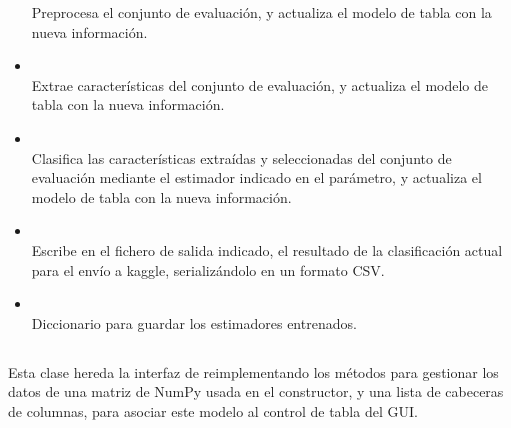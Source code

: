 \begin{itemize}
Preprocesa el conjunto de evaluación, y actualiza el modelo de tabla con la nueva información.
\item {}\\
Extrae características del conjunto de evaluación, y actualiza el modelo de tabla con la nueva información.
\item {}\\
Clasifica las características extraídas y seleccionadas del conjunto de evaluación mediante el estimador indicado en el parámetro, y actualiza el modelo de tabla con la nueva información.
\item {}\\
Escribe en el fichero de salida indicado, el resultado de la clasificación actual para el envío a kaggle, serializándolo en un formato CSV.
\item {}\\
Diccionario para guardar los estimadores entrenados.
\end{itemize}

\subsection{}

Esta clase hereda la interfaz de  reimplementando los métodos  para gestionar los datos de una matriz de NumPy usada en el constructor, y una lista de cabeceras de columnas, para asociar este modelo al control de tabla del GUI.
